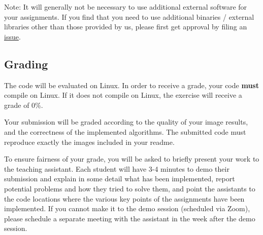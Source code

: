 \documentclass[11pt]{report}
\begin{document}
Note: It will generally not be necessary to use additional external software for your assignments. If you find that you need to use additional binaries / external libraries other than those provided by us, please first get approval by filing an \href{https://github.com/danielepanozzo/cg/issues}{issue}.

\subsection*{Grading}

The code will be evaluated on Linux. In order to receive a grade, your code \textbf{must} compile on Linux. If it does not compile on Linux, the exercise will receive a grade of 0\%. 

Your submission will be graded according to the quality of your image results, and the correctness of the implemented algorithms. The submitted code must reproduce exactly the images included in your readme. 

To ensure fairness of your grade, you will be asked to briefly present your work to the teaching assistant. Each student will have 3-4 minutes to demo their submission and explain in some detail what has been implemented, report potential problems and how they tried to solve them, and point the assistants to the code locations where the various key points of the assignments have been implemented. If you cannot make it to the demo session (scheduled via Zoom), please schedule a separate meeting with the assistant in the week after the demo session.
\end{document}
